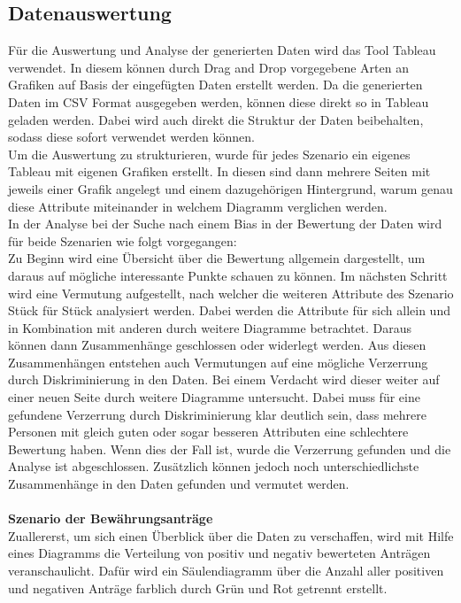 \begin{onehalfspace}
\section{Datenauswertung}
\label{datenauswertung}
Für die Auswertung und Analyse der generierten Daten wird das Tool Tableau verwendet. In diesem können durch Drag and Drop vorgegebene Arten an Grafiken auf Basis der eingefügten Daten erstellt werden. Da die generierten Daten im CSV Format ausgegeben werden, können diese direkt so in Tableau geladen werden. Dabei wird auch direkt die Struktur der Daten beibehalten, sodass diese sofort verwendet werden können.\\
Um die Auswertung zu strukturieren, wurde für jedes Szenario ein eigenes Tableau mit eigenen Grafiken erstellt. In diesen sind dann mehrere Seiten mit jeweils einer Grafik angelegt und einem dazugehörigen Hintergrund, warum genau diese Attribute miteinander in welchem Diagramm verglichen werden.\\
In der Analyse bei der Suche nach einem Bias in der Bewertung der Daten wird für beide Szenarien wie folgt vorgegangen:\\
Zu Beginn wird eine Übersicht über die Bewertung allgemein dargestellt, um daraus auf mögliche interessante Punkte schauen zu können. Im nächsten Schritt wird eine Vermutung aufgestellt, nach welcher die weiteren Attribute des Szenario Stück für Stück analysiert werden. Dabei werden die Attribute für sich allein und in Kombination mit anderen durch weitere Diagramme betrachtet. Daraus können dann Zusammenhänge geschlossen oder widerlegt werden. Aus diesen Zusammenhängen entstehen auch Vermutungen auf eine mögliche Verzerrung durch Diskriminierung in den Daten. Bei einem Verdacht wird dieser weiter auf einer neuen Seite durch weitere Diagramme untersucht. Dabei muss für eine gefundene Verzerrung durch Diskriminierung klar deutlich sein, dass mehrere Personen mit gleich guten oder sogar besseren Attributen eine schlechtere Bewertung haben. Wenn dies der Fall ist, wurde die Verzerrung gefunden und die Analyse ist abgeschlossen. Zusätzlich können jedoch noch unterschiedlichste Zusammenhänge in den Daten gefunden und vermutet werden.\\\\
\textbf{Szenario der Bewährungsanträge}\\
Zuallererst, um sich einen Überblick über die Daten zu verschaffen, wird mit Hilfe eines Diagramms die Verteilung von positiv und negativ bewerteten Anträgen veranschaulicht. Dafür wird ein Säulendiagramm über die Anzahl aller positiven und negativen Anträge farblich durch Grün und Rot getrennt erstellt.\\

\end{onehalfspace}

